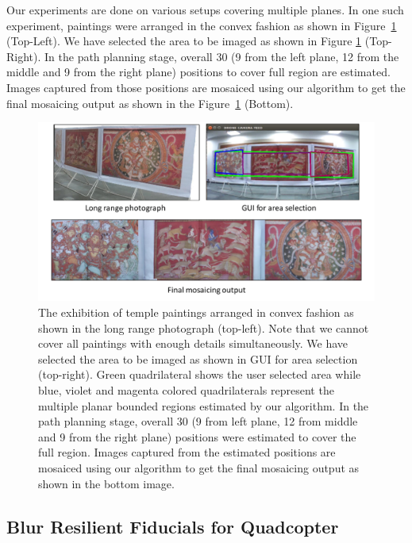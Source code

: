 Our experiments are done on various setups covering multiple planes.
In one such experiment, paintings were arranged in the convex
fashion as shown in Figure~\ref{fig:multiplanar_result} (Top-Left). We have
selected the area to be imaged as shown in Figure \ref{fig:multiplanar_result}
(Top-Right). In the path planning stage, overall 30 (9 from the left plane, 12 from the middle
and 9 from the right plane) positions to cover full region are estimated.  Images
captured from those positions are mosaiced using our algorithm to get the final
mosaicing output as shown in the Figure~\ref{fig:multiplanar_result} (Bottom).
\begin{figure}[h!]
	\centering
	\includegraphics[width=0.98\linewidth]{figures/multiplanar/convexResult}
	\caption[Result: Imaging Convex Surface ]{The exhibition of 
	temple paintings arranged in convex fashion as shown in the long range photograph (top-left). Note that we
cannot cover all paintings with enough details simultaneously. We have selected
the area to be imaged as shown in GUI for area selection (top-right).
Green quadrilateral shows the user selected area while blue, violet and magenta
colored quadrilaterals represent the multiple planar bounded regions
estimated by our algorithm. In the path planning stage, overall 30 (9 from left
plane, 12 from middle and 9 from the right plane) positions were estimated to cover
the full region. Images captured from the estimated positions are mosaiced using
our algorithm to get the final mosaicing output as shown in the bottom image.}	
	\label{fig:multiplanar_result}
\end{figure}
	
\subsection{Blur Resilient Fiducials for Quadcopter}

